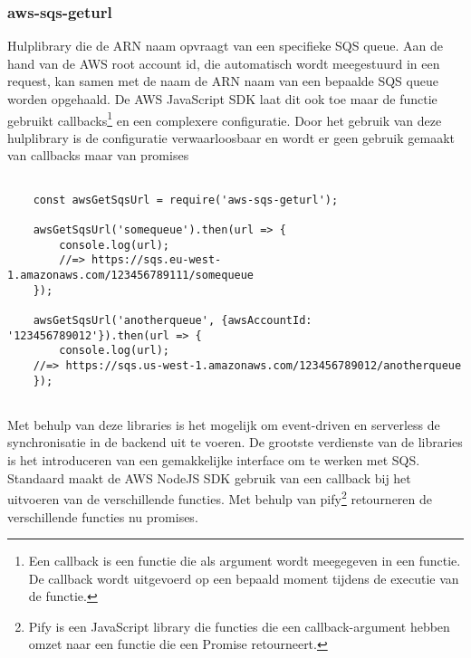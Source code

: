 \subsubsection{aws-sqs-geturl}
Hulplibrary die de ARN naam opvraagt van een specifieke SQS queue. Aan de hand van de AWS root account id, die automatisch wordt meegestuurd in een request, kan samen met de naam de ARN naam van een bepaalde SQS queue worden opgehaald. De AWS JavaScript SDK laat dit ook toe maar de functie gebruikt callbacks\footnote{Een callback is een functie die als argument wordt meegegeven in een functie. De callback wordt uitgevoerd op een bepaald moment tijdens de executie van de functie.}  en een complexere configuratie. Door het gebruik van deze hulplibrary is de configuratie verwaarloosbaar en wordt er geen gebruik gemaakt van callbacks maar van promises

\begin{lstlisting}[caption=Voorbeeld hoe de ARN van een SQS wordt opgehaald]

	const awsGetSqsUrl = require('aws-sqs-geturl');

	awsGetSqsUrl('somequeue').then(url => {
		console.log(url);
		//=> https://sqs.eu-west-1.amazonaws.com/123456789111/somequeue
	});

	awsGetSqsUrl('anotherqueue', {awsAccountId: '123456789012'}).then(url => {
		console.log(url);
	//=> https://sqs.us-west-1.amazonaws.com/123456789012/anotherqueue
	});
	
\end{lstlisting}

Met behulp van deze libraries is het mogelijk om event-driven en serverless de synchronisatie in de backend uit te voeren. De grootste verdienste van de libraries is het introduceren van een gemakkelijke interface om te werken met SQS. Standaard maakt de AWS NodeJS SDK gebruik van een callback bij het uitvoeren van de verschillende functies. Met behulp van pify\footnote{Pify is een JavaScript library die functies die een callback-argument hebben omzet naar een functie die een Promise retourneert.} retourneren de verschillende functies nu promises.
